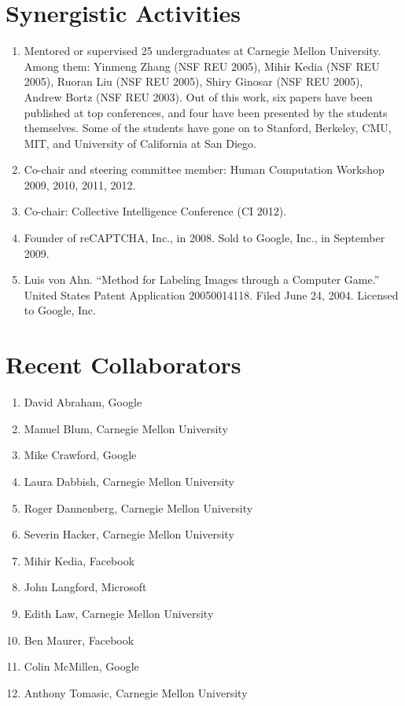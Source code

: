 \documentclass{article}
\newenvironment{denseenumerate}%
	{\begin{enumerate}\setlength{\itemsep}{0pt}\setlength{\parsep}{0pt}}%
	{\end{enumerate}}
\begin{document}
\section*{Synergistic Activities}
\begin{denseenumerate}
\item Mentored or supervised 25 undergraduates at Carnegie Mellon University. 
Among them: Yinmeng Zhang (NSF REU 2005), Mihir Kedia (NSF REU 2005), 
Ruoran Liu (NSF REU 2005), Shiry Ginosar (NSF REU 2005), Andrew Bortz 
(NSF REU 2003). Out of this work, six papers have been published at top 
conferences, and four have been presented by the students themselves. 
Some of the students have gone on to Stanford, Berkeley, CMU, MIT, and 
University of California at San Diego.

\item Co-chair and steering committee member: Human Computation Workshop 
2009, 2010, 2011, 2012.

\item Co-chair: Collective Intelligence Conference (CI 2012).

\item Founder of reCAPTCHA, Inc., in 2008. Sold to Google, Inc., in September 
2009.

\item Luis von Ahn. ``Method for Labeling Images through a Computer Game.''
United States Patent Application 20050014118. Filed June 24, 2004. 
Licensed to Google, Inc.
\end{denseenumerate}

\section*{Recent Collaborators}
\begin{denseenumerate}
\item David Abraham, Google 
\item Manuel Blum, Carnegie Mellon University 
\item Mike Crawford, Google
\item Laura Dabbish, Carnegie Mellon University
\item Roger Dannenberg, Carnegie Mellon University 
\item Severin Hacker, Carnegie Mellon University 
\item Mihir Kedia, Facebook 
\item John Langford, Microsoft
\item Edith Law, Carnegie Mellon University 
\item Ben Maurer, Facebook 
\item Colin McMillen, Google
\item Anthony Tomasic, Carnegie Mellon University
\end{denseenumerate}
\end{document}
